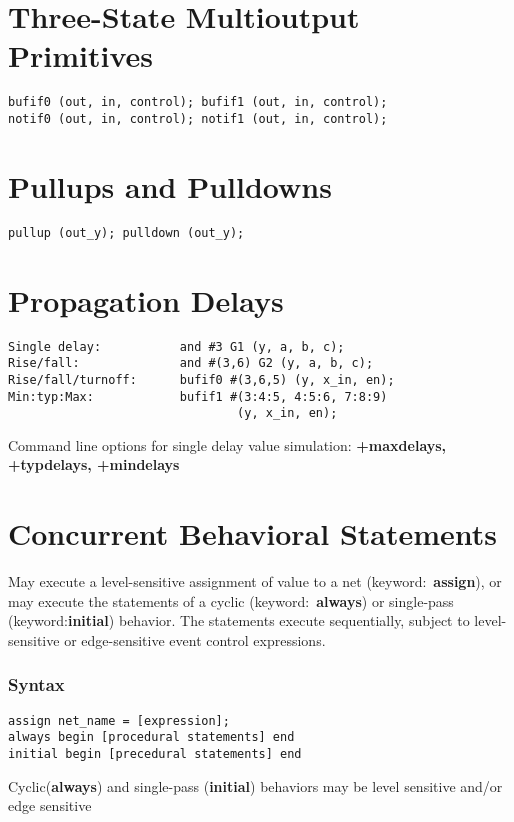 \documentclass[10pt,twocolumn]{article}
\begin{document}
\section*{Three-State  Multioutput Primitives}\vspace{-10pt}
\begin{lstlisting}
bufif0 (out, in, control); bufif1 (out, in, control);
notif0 (out, in, control); notif1 (out, in, control);
\end{lstlisting}
%
\section*{Pullups and Pulldowns}\vspace{-10pt}
\begin{lstlisting}
pullup (out_y); pulldown (out_y);
\end{lstlisting}
%
\section*{Propagation Delays}\vspace{-10pt}
\begin{lstlisting}
Single delay:           and #3 G1 (y, a, b, c);
Rise/fall:              and #(3,6) G2 (y, a, b, c);
Rise/fall/turnoff:      bufif0 #(3,6,5) (y, x_in, en);
Min:typ:Max:            bufif1 #(3:4:5, 4:5:6, 7:8:9)
                                (y, x_in, en);
\end{lstlisting}
Command line options for single delay value simulation:
\textbf{+maxdelays, +typdelays, +mindelays}
%
\section*{Concurrent Behavioral Statements}\vspace{-10pt}
May execute a level-sensitive assignment of value to a net (keyword:~\textbf{assign}), or may execute the statements of a cyclic (keyword:~\textbf{always}) or single-pass (keyword:\textbf{initial}) behavior. The statements execute sequentially, subject to level-sensitive or edge-sensitive event control expressions.
\subsubsection*{Syntax}\vspace{-10pt}
\begin{lstlisting}
assign net_name = [expression];
always begin [procedural statements] end
initial begin [precedural statements] end
\end{lstlisting}
Cyclic(\textbf{always}) and single-pass (\textbf{initial}) behaviors may be level sensitive and/or edge sensitive
\end{document}
